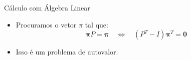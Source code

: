 \documentclass{beamer}
\begin{document}

\begin{frame}{Cálculo com Álgebra Linear}
\begin{itemize}
    \item Procuramos o vetor \( \pi \) tal que:
    \[ \bm\pi P = \bm\pi \quad \Leftrightarrow \quad (P^T - I)\bm\pi^T = \bm0 \]
    \item Isso é um problema de autovalor.
\end{itemize}
\end{frame}

\end{document}
